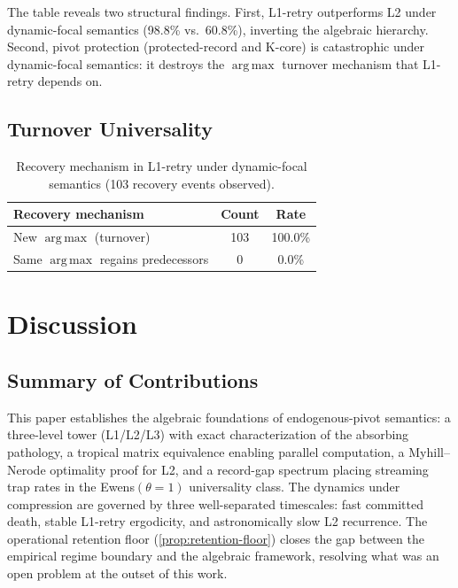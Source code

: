 \documentclass[11pt]{article}
\theoremstyle{plain}
\theoremstyle{definition}
\theoremstyle{remark}
\DeclareMathOperator*{\argmax}{arg\,max}
\begin{document}
\noindent The table reveals two structural findings.  First, L1-retry
outperforms L2 under dynamic-focal semantics (98.8\% vs.\ 60.8\%),
inverting the algebraic hierarchy.  Second, pivot protection
(protected-record and K-core) is catastrophic under dynamic-focal
semantics: it destroys the $\argmax$ turnover mechanism that L1-retry
depends on.

\subsection{Turnover Universality}

\begin{table}[H]
\centering
\caption{Recovery mechanism in L1-retry under dynamic-focal semantics
  (103 recovery events observed).}
\label{tab:turnover}
\begin{tabular}{@{}lcc@{}}
\toprule
\textbf{Recovery mechanism} & \textbf{Count} & \textbf{Rate} \\
\midrule
New $\argmax$ (turnover)           & 103 & 100.0\% \\
Same $\argmax$ regains predecessors & 0   & 0.0\% \\
\bottomrule
\end{tabular}
\end{table}

\section{Discussion}\label{sec:discussion}

\subsection{Summary of Contributions}

This paper establishes the algebraic foundations of endogenous-pivot
semantics: a three-level tower (L1/L2/L3) with exact characterization
of the absorbing pathology, a tropical matrix equivalence enabling
parallel computation, a Myhill--Nerode optimality proof for L2, and a
record-gap spectrum placing streaming trap rates in the
Ewens$(\theta=1)$ universality class.  The dynamics under compression
are governed by three well-separated timescales: fast committed death,
stable L1-retry ergodicity, and astronomically slow L2 recurrence.
The operational retention floor (\cref{prop:retention-floor}) closes
the gap between the empirical regime boundary and the algebraic
framework, resolving what was an open problem at the outset of this
work.
\end{document}
